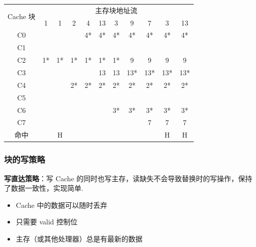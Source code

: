 \documentclass[cn, hazy, blue, normal, 12pt]{elegantnote}
\begin{document}
\begin{table}[h]
    \centering
    \begin{tabular}{ccccccccccc}
        \hline
        \multirow{2}{*}{Cache 块} & \multicolumn{10}{c}{主存块地址流}                                                  \\ \cline{2-11}
                                 & 1                           & 1  & 2  & 4  & 13 & 3  & 9   & 7   & 3   & 13  \\ \hline
        C0                       &                             &    &    & 4* & 4* & 4* & 4*  & 4*  & 4*  & 4*  \\
        C1                       &                             &    &    &    &    &    &     &     &     &     \\
        C2                       & 1*                          & 1* & 1* & 1* & 1* & 1* & 9   & 9   & 9   & 9   \\
        C3                       &                             &    &    &    & 13 & 13 & 13* & 13* & 13* & 13* \\
        C4                       &                             &    & 2* & 2* & 2* & 2* & 2*  & 2*  & 2*  & 2*  \\
        C5                       &                             &    &    &    &    &    &     &     &     &     \\
        C6                       &                             &    &    &    &    & 3* & 3*  & 3*  & 3*  & 3*  \\
        C7                       &                             &    &    &    &    &    &     & 7   & 7   & 7   \\
        命中                       &                             & H  &    &    &    &    &     &     & H   & H   \\ \hline
    \end{tabular}
\end{table}

\subsubsection{块的写策略}

\textbf{写直达策略}：写 Cache 的同时也写主存，读缺失不会导致替换时的写操作，保持了数据一致性，实现简单.
\begin{itemize}
    \item Cache 中的数据可以随时丢弃
    \item 只需要 valid 控制位
    \item 主存（或其他处理器）总是有最新的数据
\end{itemize}
\end{document}
